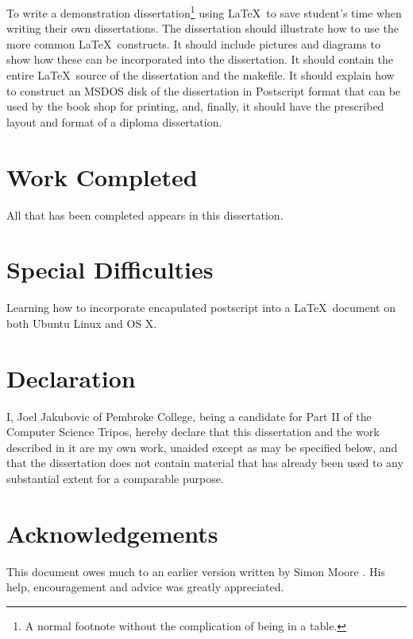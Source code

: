 \documentclass[12pt,a4paper,twoside,openright]{report}
\begin{document}
{To write a demonstration dissertation\footnote{A normal footnote without the
complication of being in a table.} using \LaTeX\ to save
student's time when writing their own dissertations. The dissertation
should illustrate how to use the more common \LaTeX\ constructs. It
should include pictures and diagrams to show how these can be
incorporated into the dissertation.  It should contain the entire
\LaTeX\ source of the dissertation and the makefile.  It should
explain how to construct an MSDOS disk of the dissertation in
Postscript format that can be used by the book shop for printing, and,
finally, it should have the prescribed layout and format of a diploma
dissertation.


\section*{Work Completed}

All that has been completed appears in this dissertation.

\section*{Special Difficulties}

Learning how to incorporate encapulated postscript into a \LaTeX\
document on both Ubuntu Linux and OS X.

\newpage
\section*{Declaration}

I, Joel Jakubovic of Pembroke College, being a candidate for Part II of the Computer
Science Tripos, hereby declare
that this dissertation and the work described in it are my own work,
unaided except as may be specified below, and that the dissertation
does not contain material that has already been used to any substantial
extent for a comparable purpose.

\bigskip
{}

\medskip
{}

\tableofcontents

\listoffigures

\newpage
\section*{Acknowledgements}

This document owes much to an earlier version written by Simon Moore
\cite{Moore95}.  His help, encouragement and advice was greatly
appreciated.

}
\end{document}
